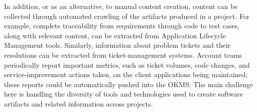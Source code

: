 
In addition, or as an alternative, to manual content creation, content can be
collected through automated crawling of the artifacts produced in a project. For
example, complete traceability from requirements through code to test cases,
along with relevant content, can be extracted from Application Lifecycle
Management tools. Similarly, information about problem tickets and their
resolutions can be extracted from ticket-management systems.  Account teams
periodically report important metrics, such as ticket volumes, code changes, and
service-improvement actions taken, on the client applications being maintained;
these reports could be automatically pushed into the OKMS. The main challenge
here is handling the diversity of tools and technologies used to create software
artifacts and related information across projects.

